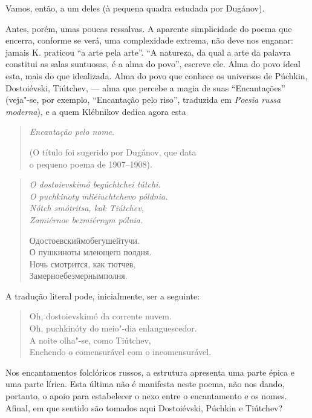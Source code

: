 Vamos, então, a um deles (à pequena quadra estudada por Dugánov).

Antes, porém, umas poucas ressalvas. A aparente simplicidade do poema
que encerra, conforme se verá, uma complexidade extrema, não deve nos
enganar: jamais K. praticou ``a arte pela arte''. ``A natureza, da qual
a arte da palavra constitui as salas suntuosas, é a alma do povo'',
escreve ele. Alma do povo ideal esta, mais do que idealizada. Alma do
povo que conhece os universos de Púchkin, Dostoiévski, Tiútchev, --- alma
que percebe a magia de suas ``Encantações'' (veja"-se, por exemplo, ``Encantação pelo riso'', traduzida em \emph{Poesia russa moderna}), e
a quem Klébnikov dedica agora esta

\begin{verse}
\emph{Encantação pelo nome}. 

(O título foi sugerido por Dugánov, que data \\
o pequeno poema de 1907--1908). 
\end{verse}

\begin{verse}
\emph{O dostoievskimó begúchtchei tútchi.} \\
\emph{O puchkinoty mliéiuchtchevo póldnia.} \\
\emph{Nótch smótritsa, kak Tiútchev,} \\
\emph{Zamiérnoe bezmiérnym pólnia.} 

Одостоевскиймобегушейтучи. \\
О пушкиноты млеющего полдня. \\
Ночь смотрится, как тютчев, \\
Замерноебезмернымполня.
\end{verse}

A tradução literal pode, inicialmente, ser a seguinte:

\begin{verse}
Oh, dostoievskimó da corrente nuvem. \\
Oh, puchkinóty do meio"-dia \qb{}enlanguescedor. \\
A noite olha"-se, como Tiútchev, \\
Enchendo o comensurável com \qb{}o incomensurável.
\end{verse}

Nos encantamentos folclóricos russos, a estrutura apresenta uma parte
épica e uma parte lírica. Esta última não é manifesta neste poema, não
nos dando, portanto, o apoio para estabelecer o nexo entre o encantamento
e os nomes. Afinal, em que sentido são tomados aqui Dostoiévski, Púchkin
e Tiútchev?

